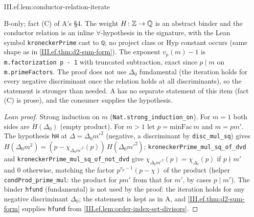 \begin{lemma}
\bonly
{}
\end{lemma}
\begin{tfformal}{III.ef.lem:conductor-relation-iterate}
\begin{tffidelity}
B-only; fact (C) of A's \S4. The weight $H\colon\mathbb{Z}\to\mathbb{Q}$ is an abstract binder and the conductor relation is an inline $\forall$-hypothesis in the signature, with the Lean symbol \texttt{kroneckerPrime} cast to \texttt{ℚ}; no project class or Hyp constant occurs (same shape as in \cref{III.ef.thm:d2-sum-form}). The exponent $v_p(m)-1$ is \texttt{m.factorization p - 1} with truncated subtraction, exact since $p\mid m$ on \texttt{m.primeFactors}. The proof does not use $\Delta_0$ fundamental (the iteration holds for every negative discriminant once the relation holds at all discriminants), so the statement is stronger than needed. A has no separate statement of this item (fact (C) is prose), and the consumer supplies the hypothesis.
\end{tffidelity}
\end{tfformal}
\begin{proof}[Lean proof]
Strong induction on $m$ (\texttt{Nat.strong\_induction\_on}). For $m=1$ both sides are $H(\Delta_0)$ (empty product). For $m>1$ let $p=\mathrm{minFac}\,m$ and $m=pm'$. The hypothesis \texttt{hH} at $\Delta=\Delta_0m'^2$ (negative, a discriminant by \texttt{disc\_mul\_sq}) gives $H(\Delta_0m^2)=(p-\chi_{\Delta_0m'^2}(p))\,H(\Delta_0m'^2)$; \texttt{kroneckerPrime\_mul\_sq\_of\_dvd} and \texttt{kroneckerPrime\_mul\_sq\_of\_not\_dvd} give $\chi_{\Delta_0m'^2}(p)=\chi_{\Delta_0}(p)$ if $p\nmid m'$ and $0$ otherwise, matching the factor $p^{v_p-1}(p-\chi)$ of the product (helper \texttt{condProd\_prime\_mul}: the product for $pm'$ from that for $m'$, by cases $p\mid m'$). The binder \texttt{hfund} (fundamental) is not used by the proof: the iteration holds for any negative discriminant $\Delta_0$; the statement is kept as in A, and \cref{III.ef.thm:d2-sum-form} supplies \texttt{hfund} from \cref{III.ef.lem:order-index-set-divisors}.
\end{proof}

